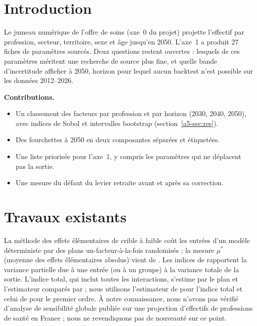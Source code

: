 \section{Introduction}
Le jumeau numérique de l'offre de soins (axe~0 du projet) projette l'effectif par profession, secteur, territoire,
sexe et âge jusqu'en 2050. L'axe~1 a produit 27 fiches de paramètres sourcés. Deux questions restent ouvertes :
lesquels de ces paramètres méritent une recherche de source plus fine, et quelle bande d'incertitude afficher à
2050, horizon pour lequel aucun backtest n'est possible sur les données 2012--2026.

\textbf{Contributions.}
\begin{itemize}
  \item Un classement des facteurs par profession et par horizon (2030, 2040, 2050), avec indices de Sobol et
        intervalles bootstrap (section~\ref{a5-sec:res}).
  \item Des fourchettes à 2050 en deux composantes séparées et étiquetées.
  \item Une liste priorisée pour l'axe~1, y compris les paramètres qui ne déplacent pas la sortie.
  \item Une mesure du défaut du levier retraite avant et après sa correction.
\end{itemize}

\section{Travaux existants}
La méthode des effets élémentaires de \citet{a5-morris1991} crible à faible coût les entrées d'un modèle déterministe
par des plans un-facteur-à-la-fois randomisés ; la mesure $\mu^*$ (moyenne des effets élémentaires absolus) vient
de \citet{a5-campolongo2007}. Les indices de \citet{a5-sobol2001} rapportent la variance partielle
due à une entrée (ou à un groupe) à la variance totale de la sortie. L'indice total, qui inclut toutes les
interactions, s'estime par le plan et l'estimateur comparés par \citet{a5-saltelli2010} ; nous utilisons l'estimateur
de \citet{a5-jansen1999} pour l'indice total et celui de \citet{a5-saltelli2010} pour le premier ordre. À notre
connaissance, nous n'avons pas vérifié d'analyse de sensibilité globale publiée sur une projection d'effectifs de
professions de santé en France ; nous ne revendiquons pas de nouveauté sur ce point.


